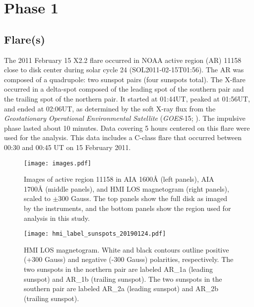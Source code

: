 \section{Phase 1}




\subsection{Flare(s)}



The 2011 February 15 X2.2 flare
occurred in NOAA active region (AR) 11158
close to disk center
during solar cycle 24 (SOL2011-02-15T01:56).
The AR was composed of a quadrupole:
two sunspot pairs (four sunspots total).
The X-flare occurred in a delta-spot composed of
the leading spot of the southern pair and
the trailing spot of the northern pair.
It started at 01:44UT, peaked at 01:56UT, and ended at 02:06UT,
as determined by the soft X-ray flux from the
\textit{Geostationary Operational Environmental Satellite}
(\textit{GOES}-15; \cite{Viereck2007}).
The impulsive phase lasted about 10 minutes.
Data covering 5 hours centered on this flare were used for the analysis.
This data includes a C-class flare that occurred between 00:30 and 00:45 UT
on 15 February 2011.



\begin{figure*}[htb!]\centering
    \texttt{[image: images.pdf]}
    \caption{
        Images of active region 11158 in AIA 1600\AA{} (left panels),
        AIA 1700\AA{} (middle panels), and HMI LOS magnetogram (right panels),
        scaled to $\pm300$ Gauss.
        The top panels show the full disk as imaged by the instruments,
        and the bottom panels show the region used for analysis in this study.
        \label{images}}
\end{figure*}
\begin{figure}[htb!]\centering
    \texttt{[image: hmi\_label\_sunspots\_20190124.pdf]}
    \caption{
        HMI LOS magnetogram.
        White and black contours outline positive (+300 Gauss)
        and negative (-300 Gauss) polarities, respectively.
        The two sunspots in the northern pair are labeled AR\_1a (leading sunspot)
        and AR\_1b (trailing sunspot).
        The two sunspots in the southern pair are labeled AR\_2a (leading sunspot)
        and AR\_2b (trailing sunspot).
        \label{label}}
\end{figure}


